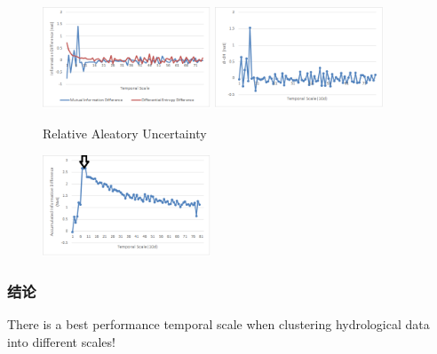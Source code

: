 \documentclass{beamer}
\begin{document}
\begin{CJK}{UTF8}{gkai}
\begin{frame}
\begin{figure}[H]
\centering
\includegraphics[width=5cm]{rau.png}
\includegraphics[width=5cm]{performance.png}
\caption{Relative Aleatory Uncertainty}
\end{figure}

\begin{figure}[H]
\centering
\includegraphics[width=5cm]{finalresult.png}
\end{figure}
\end{frame}


\begin{frame}
\frametitle{结论}
There is a best performance temporal scale when clustering hydrological data into different scales!
\end{frame}


 

\end{CJK}
\end{document}
